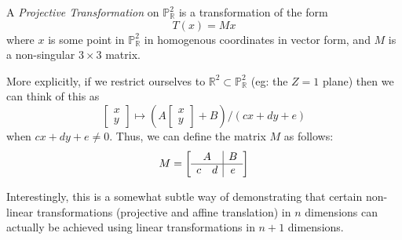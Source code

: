 \begin{mydef}
A \emph{Projective Transformation} on $\mathbb{P}^2_\mathbb{R}$ is a
transformation of the form
\[
T(x) = Mx
\]
where $x$ is some point in $\mathbb{P}^2_\mathbb{R}$ in homogenous coordinates in vector form,
and $M$ is a non-singular $3\times3$ matrix.
\end{mydef}

More explicitly, if we restrict ourselves to $\mathbb{R}^2 \subset \mathbb{P}^2_\mathbb{R}$
(eg: the $Z=1$ plane) then we can think of this as
\[
\begin{bmatrix}
x\\
y
\end{bmatrix} \mapsto
(A\begin{bmatrix}
x\\
y
\end{bmatrix} + B) / (cx+dy+e)
\]
when $cx+dy+e \ne 0$. Thus, we can define the matrix $M$ as follows:
\[
M= \left[\begin{array}{cc|c}
\multicolumn{2}{c|}{A} & B\\
\hline
c & d & e
\end{array}\right]
\]

Interestingly, this is a somewhat subtle way of demonstrating that certain
non-linear transformations (projective and affine translation) in $n$
dimensions can actually be achieved using linear transformations in $n+1$ dimensions.

